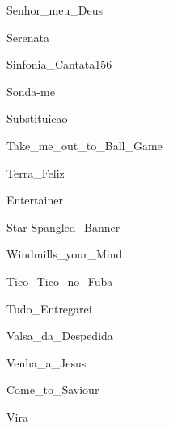 \documentclass{article}
\begin{document}

{Senhor_meu_Deus}


{Serenata}


{Sinfonia_Cantata156}


{Sonda-me}


{Substituicao}


{Take_me_out_to_Ball_Game}


{Terra_Feliz}


{Entertainer}


{Star-Spangled_Banner}


{Windmills_your_Mind}


{Tico_Tico_no_Fuba}


{Tudo_Entregarei}


{Valsa_da_Despedida}


{Venha_a_Jesus}


{Come_to_Saviour}


{Vira}
\end{document}
